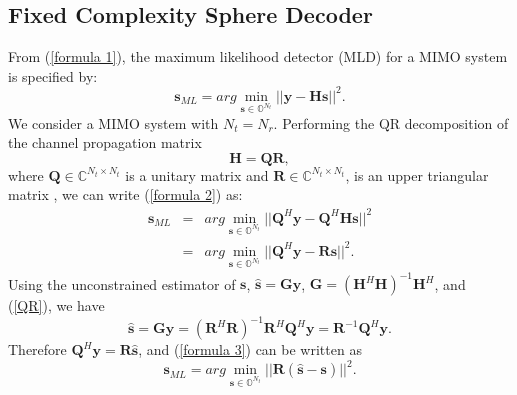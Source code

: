 \documentclass[letterpaper, 10pt, conference]{ieeeconf}
\begin{document}
\subsection{Fixed Complexity Sphere Decoder}
From (\ref{formula 1}), the maximum likelihood detector (MLD) for a MIMO system is specified by:
\begin{equation}
\mathbf{s}_{ML}=arg\min_{\mathbf{s}\in \mathbb{O}^{N_{t}}}||\mathbf{y}-\mathbf{H}\mathbf{s}||^{2}. \label{formula 2}
\end{equation}
We consider a MIMO system with  $N_{t}=N_{r}$. Performing the QR decomposition of the channel propagation matrix
\begin{equation}
 \mathbf{H}=\mathbf{Q}\mathbf{R},  \label{QR}
\end{equation}
where $\mathbf{Q}\in \mathbb{C}^{N_{t}\times N_{t}}$ is a unitary matrix and $\mathbf{R}\in \mathbb{C}^{N_{t}\times N_{t}}$, is an upper triangular matrix \cite{golub2012matrix}, we can write (\ref{formula 2}) as:
\begin{eqnarray}
\nonumber
\mathbf{s}_{ML}&=&arg\min_{\mathbf{s}\in \mathbb{O}^{N_{t}}}||\mathbf{Q}^{H}\mathbf{y}-\mathbf{Q}^{H}\mathbf{H}\mathbf{s}||^{2}\\
&=& arg\min_{\mathbf{s}\in \mathbb{O}^{N_{t}}}||\mathbf{Q}^{H}\mathbf{y}-\mathbf{R}\mathbf{s}||^{2}. \label{formula 3}
\end{eqnarray}
Using the unconstrained estimator of $\mathbf{s}$, $\mathbf{\hat{s}}=\mathbf{G}\mathbf{y}$, $\mathbf{G}=(\mathbf{H}^{H}\mathbf{H})^{-1}\mathbf{H}^{H}$, and (\ref{QR}), we have  
\begin{equation}
\mathbf{\hat{s}}=\mathbf{G}\mathbf{y}=(\mathbf{R}^{H}\mathbf{R})^{-1}\mathbf{R}^{H}\mathbf{Q}^{H}\mathbf{y}
=\mathbf{R}^{-1}\mathbf{Q}^{H}\mathbf{y}.
\label{unconstrained estimation}
\end{equation} 
Therefore $\mathbf{Q}^{H}\mathbf{y}=\mathbf{R}\mathbf{\hat{s}}$, and (\ref{formula 3}) can be written as
\begin{equation}
\mathbf{s}_{ML}=arg\min_{\mathbf{s}\in \mathbb{O}^{N_{t}}}||\mathbf{R}(\mathbf{\hat{s}}-\mathbf{s})||^{2}. \label{formula 4}
\end{equation}
\end{document}
